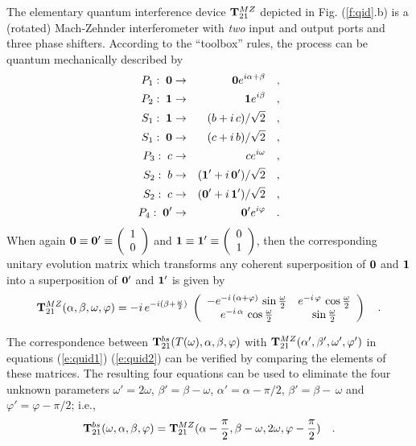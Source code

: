 The
elementary quantum interference device ${\bf T}_{21}^{MZ}$ depicted in
Fig.
(\ref{f:qid}.b)
is a (rotated) Mach-Zehnder interferometer with {\em two}
input and output ports and three phase shifters.
According to the ``toolbox'' rules, the process can
be quantum mechanically described by
\begin{eqnarray}
P_1:\; {\bf 0}  &\rightarrow&  {\bf 0} e^{i
\alpha +\beta}
\quad , \\
P_2:\; {\bf 1}  &\rightarrow&  {\bf 1} e^{i
\beta}
\quad , \\
S_1:\; {\bf 1}  &\rightarrow& ( b  +i\,
c )/\sqrt{2}
\quad , \\
S_1:\; {\bf 0}  &\rightarrow& ( c  +i\,
b )/\sqrt{2}
\quad , \\
P_3:\; c  &\rightarrow&  c e^{i \omega
}\quad ,\\
S_2:\; b  &\rightarrow& ( {\bf 1}'  + i\,
{\bf 0}' )/\sqrt{2}\quad ,\\
S_2:\; c  &\rightarrow& ( {\bf 0}'  + i\,
{\bf 1}' )/\sqrt{2}\quad ,\\
P_4:\; {\bf 0}'  &\rightarrow&  {\bf 0}' e^{i
\varphi
}\quad .
\end{eqnarray}
When again
$ {\bf 0} \equiv   {\bf 0}' \equiv
\left(
\begin{array}{c}
1 \\
0
 \end{array}
\right)
$
and
$ {\bf 1} \equiv  {\bf 1}' \equiv
\left(
\begin{array}{c}
0 \\
1
 \end{array}
\right)
$, then
the corresponding unitary evolution matrix
which transforms any coherent superposition of $ {\bf 0} $
and $ {\bf 1} $
into a superposition of
$ {\bf 0}' $
and
$ {\bf 1}' $
 is given by
\begin{equation}
{\bf T}_{21}^{MZ} (\alpha ,\beta ,\omega ,\varphi )=
-i\,e^{-i(\beta +{\omega \over 2})}\;\left(
\begin{array}{cc}
-{e^{-i\,({\alpha +\varphi })}}\,\sin {{\omega }\over 2}
&
   {e^{-i\,{\varphi}}}\,\cos {{\omega }\over 2} \\
  e^{-i\,{\alpha }}\,\cos {{\omega }\over 2}&\sin {{\omega }\over
2}
 \end{array}
\right)
 \quad .
\label{e:quid2}
\end{equation}


The correspondence between
${\bf T}_{21}^{bs} (T(\omega ),\alpha ,\beta ,\varphi )$ with
${\bf T}_{21}^{MZ} (\alpha ',\beta ',\omega ',\varphi ')$ in equations
(\ref{e:quid1})
(\ref{e:quid2}) can be verified by comparing the elements of these
matrices.
The resulting four equations can be used to eliminate the four unknown
parameters
$\omega '=2\omega $,
$\beta '=\beta -\omega$,
$\alpha '=\alpha -\pi /2$,
$\beta '=\beta -\, \omega$ and
$\varphi '=\varphi -\pi /2$; i.e.,
\begin{equation}
{\bf T}_{21}^{bs} (\omega ,\alpha ,\beta ,\varphi ) =
{\bf T}_{21}^{MZ} (\alpha -{\pi \over 2}, \beta
-\omega ,2\omega
,\varphi
-{\pi \over 2})
\quad .
\end{equation}


